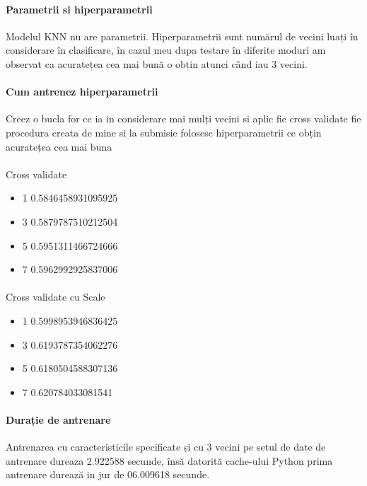 \documentclass{article}
\begin{document}
\paragraph{Parametrii si hiperparametrii} Modelul KNN nu are parametrii. Hiperparametrii sunt numărul de vecini luați în considerare în clasificare, în cazul meu dupa testare în diferite moduri am observat ca acuratețea cea mai bună o obțin atunci când iau 3 vecini.
\paragraph{Cum antrenez hiperparametrii} Creez o bucla for ce ia in considerare mai mulți vecini si aplic fie cross validate fie procedura creata de mine si la submisie folosesc hiperparametrii ce obțin acuratețea cea mai buna
 
\paragraph{} Cross validate
\begin{itemize}
  \item 1 0.5846458931095925
  \item 3 0.5879787510212504
  \item 5 0.5951311466724666
  \item 7 0.5962992925837006
\end{itemize}
 
\paragraph{} Cross validate cu Scale
\begin{itemize}
  \item 1 0.5998953946836425
  \item 3 0.6193787354062276
  \item 5 0.6180504588307136
  \item 7 0.620784033081541
\end{itemize}
 
\paragraph{Durație de antrenare} Antrenarea cu caracteristicile specificate și cu 3 vecini pe setul de date de antrenare dureaza 2.922588 secunde, însă datorită cache-ului Python prima antrenare durează in jur de 06.009618 secunde.
\end{document}
